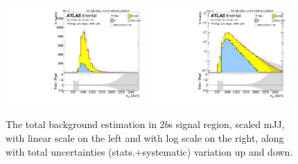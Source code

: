 \begin{figure}
\begin{center}
\includegraphics[angle=270, width=0.48\textwidth]{./figures/boosted/Signal_Syst/Moriond_bkg_9_TwoTag_split_Signal_mHH_pole_blind.pdf}
\includegraphics[angle=270, width=0.48\textwidth]{./figures/boosted/Signal_Syst/Moriond_bkg_9_TwoTag_split_Signal_mHH_pole_1_blind.pdf}
\caption{The total background estimation in $2b$s signal region, scaled mJJ, with linear scale on the left and with log scale on the right, along with total uncertainties (stats.$+$systematic) variation up and down.}
\label{fig:FinalBkg_sys-2b-pole}
\end{center}
\end{figure}
